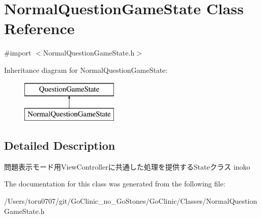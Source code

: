 \hypertarget{interface_normal_question_game_state}{
\section{NormalQuestionGameState Class Reference}
\label{interface_normal_question_game_state}
}


{\ttfamily \#import $<$NormalQuestionGameState.h$>$}

Inheritance diagram for NormalQuestionGameState:\begin{figure}[H]
\begin{center}
\leavevmode
\includegraphics[height=2.000000cm]{interface_normal_question_game_state}
\end{center}
\end{figure}


\subsection{Detailed Description}
問題表示モード用ViewControllerに共通した処理を提供するStateクラス  inoko 

The documentation for this class was generated from the following file:\begin{DoxyCompactItemize}
\item 
/Users/toru0707/git/GoClinic\_\-no\_\-GoStones/GoClinic/Classes/NormalQuestionGameState.h\end{DoxyCompactItemize}
